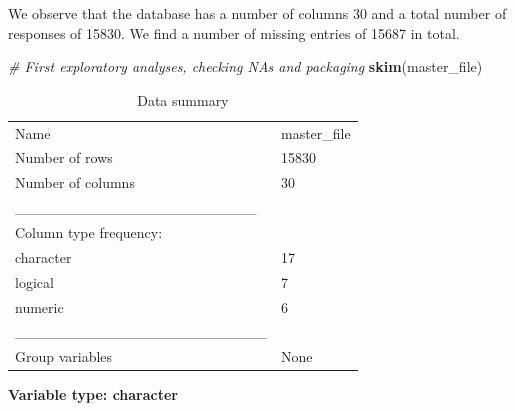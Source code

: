 \documentclass[
]{article}
\newenvironment{Shaded}{\begin{snugshade}}{\end{snugshade}}
\newcommand{\CommentTok}[1]{\textcolor[rgb]{0.56,0.35,0.01}{\textit{#1}}}
\newcommand{\FunctionTok}[1]{\textcolor[rgb]{0.13,0.29,0.53}{\textbf{#1}}}
\newcommand{\NormalTok}[1]{#1}
\begin{document}
We observe that the database has a number of columns 30 and a total
number of responses of 15830. We find a number of missing entries of
15687 in total.

\begin{Shaded}
\begin{Highlighting}[]
\CommentTok{\# First exploratory analyses, checking NA\textquotesingle{}s and packaging }
\FunctionTok{skim}\NormalTok{(master\_file)}
\end{Highlighting}
\end{Shaded}

\begin{longtable}[]{@{}ll@{}}
\caption{Data summary}\tabularnewline
\toprule\noalign{}
\endfirsthead
\endhead
\bottomrule\noalign{}
\endlastfoot
Name & master\_file \\
Number of rows & 15830 \\
Number of columns & 30 \\
\_\_\_\_\_\_\_\_\_\_\_\_\_\_\_\_\_\_\_\_\_\_\_ & \\
Column type frequency: & \\
character & 17 \\
logical & 7 \\
numeric & 6 \\
\_\_\_\_\_\_\_\_\_\_\_\_\_\_\_\_\_\_\_\_\_\_\_\_ & \\
Group variables & None \\
\end{longtable}

\textbf{Variable type: character}
\end{document}
